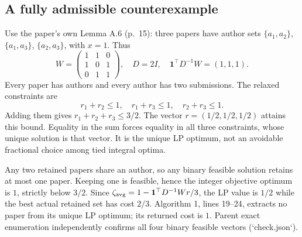 \documentclass[10pt]{article}
\begin{document}
\subsection*{A fully admissible counterexample}
Use the paper’s own Lemma A.6 (p. 15): three papers have author sets \(\{a_1,a_2\}\), \(\{a_1,a_3\}\), \(\{a_2,a_3\}\), with \(x=1\). Thus \[W=\begin{pmatrix}1&1&0\\1&0&1\\0&1&1\end{pmatrix},
\quad D=2I,\quad \mathbf1^\top D^{-1}W=(1,1,1).\] Every paper has authors and every author has two submissions. The relaxed constraints are \[r_1+r_2\le1,\quad r_1+r_3\le1,\quad r_2+r_3\le1.\] Adding them gives \(r_1+r_2+r_3\le3/2\). The vector \(r=(1/2,1/2,1/2)\) attains this bound. Equality in the sum forces equality in all three constraints, whose unique solution is that vector. It is the unique LP optimum, not an avoidable fractional choice among tied integral optima.\par
Any two retained papers share an author, so any binary feasible solution retains at most one paper. Keeping one is feasible, hence the integer objective optimum is \(1\), strictly below \(3/2\). Since \(\zeta_{\rm avg}=1-\mathbf1^\top D^{-1}Wr/3\), the LP value is \(1/2\) while the best actual retained set has cost \(2/3\). Algorithm 1, lines 19–24, extracts no paper from its unique LP optimum; its returned cost is \(1\). Parent exact enumeration independently confirms all four binary feasible vectors (`check.json`).\par
\end{document}
